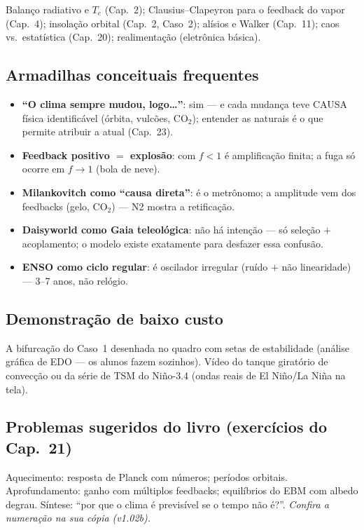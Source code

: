 Balanço radiativo e $T_e$ (Cap.~2); Clausius--Clapeyron para o
feedback do vapor (Cap.~4); insolação orbital (Cap.~2, Caso~2);
alísios e Walker (Cap.~11); caos vs.\ estatística (Cap.~20);
realimentação (eletrônica básica).

\subsection*{Armadilhas conceituais frequentes}

\begin{itemize}
  \item \textbf{``O clima sempre mudou, logo\ldots''}: sim — e cada
        mudança teve CAUSA física identificável (órbita, vulcões,
        CO$_2$); entender as naturais é o que permite atribuir a
        atual (Cap.~23).
  \item \textbf{Feedback positivo $=$ explosão}: com $f<1$ é
        amplificação finita; a fuga só ocorre em $f\to1$ (bola de
        neve).
  \item \textbf{Milankovitch como ``causa direta''}: é o metrônomo;
        a amplitude vem dos feedbacks (gelo, CO$_2$) — N2 mostra a
        retificação.
  \item \textbf{Daisyworld como Gaia teleológica}: não há intenção —
        só seleção $+$ acoplamento; o modelo existe exatamente para
        desfazer essa confusão.
  \item \textbf{ENSO como ciclo regular}: é oscilador irregular
        (ruído $+$ não linearidade) — 3--7 anos, não relógio.
\end{itemize}

\subsection*{Demonstração de baixo custo}

A bifurcação do Caso~1 desenhada no quadro com setas de estabilidade
(análise gráfica de EDO — os alunos fazem sozinhos). Vídeo do tanque
giratório de convecção ou da série de TSM do Niño-3.4 (ondas reais de
El Niño/La Niña na tela).

\subsection*{Problemas sugeridos do livro (exercícios do Cap.~21)}

Aquecimento: resposta de Planck com números; períodos orbitais.
Aprofundamento: ganho com múltiplos feedbacks; equilíbrios do EBM com
albedo degrau. Síntese: ``por que o clima é previsível se o tempo não
é?''. \emph{Confira a numeração na sua cópia (v1.02b).}


